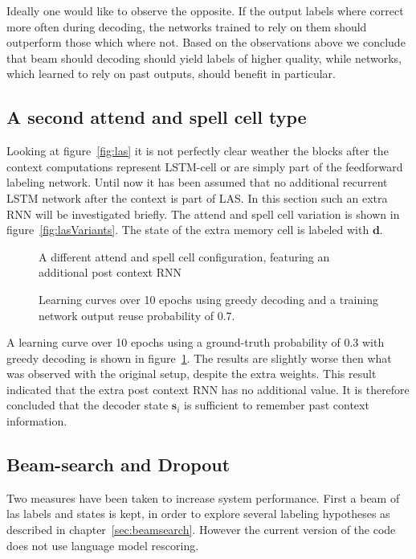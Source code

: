 Ideally one would like to observe the opposite. If the output labels where correct more often during decoding, the networks trained to rely on them should outperform those which where not. Based on the observations above we conclude that beam should decoding should yield labels of higher quality, while networks, which learned to rely on past outputs, should benefit in particular.


\subsection{A second attend and spell cell type}
Looking at figure~\ref{fig:las} it is not perfectly clear weather the blocks after the context computations represent LSTM-cell or are simply part of the feedforward labeling network. Until now it has been assumed that no additional recurrent LSTM network after the context is part of LAS. In this section such an extra RNN will be investigated briefly. The attend and spell cell variation is shown in figure~\ref{fig:lasVariants}. The state of the extra memory cell is labeled with $\mathbf{d}$.
\begin{figure}
\centering

\caption{A different attend and spell cell configuration, featuring an additional post context RNN}
\label{fig:lasVariants}

\caption{Learning curves over 10 epochs using greedy decoding and a training network output reuse probability of 0.7.}
\label{fig:variantResult}
\end{figure}
A learning curve over 10 epochs using a ground-truth probability of 0.3 with greedy decoding is shown in figure~\ref{fig:variantResult}. The results are slightly worse then what was observed with the original setup, despite the extra weights. This result indicated that the extra post context RNN has no additional value.
It is therefore concluded that the decoder state $\mathbf{s}_i$ is sufficient to remember past context information.

\subsection{Beam-search and Dropout}
Two measures have been taken to increase system performance. First a beam of las labels and states is kept, in order to explore several labeling hypotheses as described in chapter~\ref{sec:beamsearch}. However the current version of the code does not use language model rescoring.

